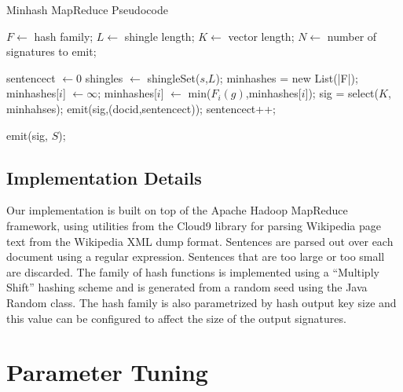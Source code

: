\documentclass{acm_proc_article-sp}
\begin{document}
\begin{table}
\begin{algorithm}[H]
\caption{Minhash MapReduce Pseudocode}
\begin{algorithmic}
 \State $F \gets $ hash family;
 \State $L \gets $ shingle length;
 \State $K \gets $ vector length;
 \State $N \gets $ number of signatures to emit;
\EndFunction

 \State sentencect $\gets 0$
  \State shingles $\gets$ shingleSet($s$,$L$);
  \State minhashes = new List(|F|);
    \State minhashes[$i$] $\gets \infty$;
   \EndFor
     \State minhashes[$i$] $\gets$ min($F_i(g)$,minhashes[$i$]);
    \EndFor
   \EndFor
   \State sig = select($K$, minhahses);
   \State emit(sig,(docid,sentencect));
  \EndFor
  \State  sentencect++;
 \EndWhile
\EndFunction

\State emit(sig, $S$);
\EndIf
\EndFunction
\end{algorithmic}
\end{algorithm}
\end{table}

\subsection{Implementation Details}

Our implementation is built on top of the Apache Hadoop MapReduce framework, using utilities from the Cloud9 library for parsing Wikipedia page text from the Wikipedia XML dump format. Sentences are parsed out over each document using a regular expression. Sentences that are too large or too small are discarded. The family of hash functions is implemented using a ``Multiply Shift''  \cite{} hashing scheme and is generated from a random seed using the Java Random class. The hash family is also parametrized by hash output key size and this value can be configured to affect the size of the output signatures.

\section{Parameter Tuning}
\end{document}
